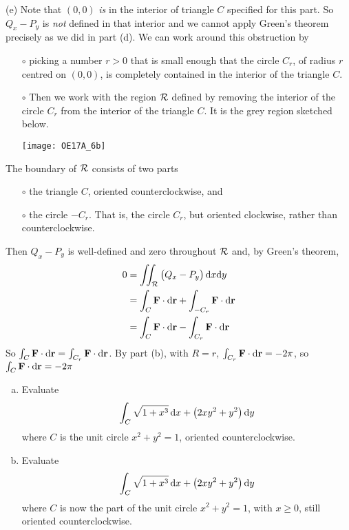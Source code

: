 \begin{solution}
(e) Note that $(0,0)$ \emph{is} in the interior of triangle $C$ specified 
for this part. So $Q_x - P_y$ is \emph{not} defined in that interior 
and we cannot apply Green's theorem precisely as we did in part (d).
We can work around this obstruction by 
\begin{itemize}\itemsep1pt \parskip0pt  %
\item[$\circ$]
picking a number $r>0$ that is small
enough that the circle $C_r$, of radius $r$ centred on $(0,0)$,
is completely contained in the interior of the triangle $C$. 
\item[$\circ$]
Then we work with
the region $\mathcal{R}$ defined by removing the interior of the circle $C_r$
from the interior of the triangle $C$. It is the grey region sketched below.
\begin{center}
     \texttt{[image: OE17A\_6b]}
\end{center}
\end{itemize}
The boundary of $\mathcal{R}$ consists of two parts
\begin{itemize}\itemsep1pt \parskip0pt  %
\item[$\circ$]
the triangle $C$, oriented counterclockwise, and
\item[$\circ$]
the circle $-C_r$. That is, the circle $C_r$, but oriented clockwise,
rather than counterclockwise.
\end{itemize}
Then $Q_x-P_y$ is well-defined and zero throughout $\mathcal{R}$ and,
by Green's theorem,
\begin{align*}
   0 &=\iint_{\mathcal{R}} \big(Q_x-P_y\big)\,\mathrm{d}x\mathrm{d}y \\
    &= \int_C \mathbf{F}\cdot\mathrm{d}\mathbf{r} 
             + \int_{-C_r} \mathbf{F}\cdot\mathrm{d}\mathbf{r} \\
    &= \int_C \mathbf{F}\cdot\mathrm{d}\mathbf{r} 
             - \int_{C_r} \mathbf{F}\cdot\mathrm{d}\mathbf{r} 
\end{align*}
So $\int_C \mathbf{F}\cdot\mathrm{d}\mathbf{r} = \int_{C_r} \mathbf{F}\cdot\mathrm{d}\mathbf{r} $.
By part (b), with $R=r$, $\int_{C_r} \mathbf{F}\cdot\mathrm{d}\mathbf{r}=-2\pi$, so
$\int_C \mathbf{F}\cdot\mathrm{d}\mathbf{r} = -2\pi$
\end{solution}

\begin{question}[M317 2017D] %
\begin{enumerate}[(a)]
\item
Evaluate
\begin{equation*}
\int_C \sqrt{1+x^3}\,\mathrm{d}x +\big(2xy^2 + y^2\big)\,\mathrm{d}y
\end{equation*}
where $C$ is the unit circle $x^2+y^2 = 1$, oriented counterclockwise.

\item 
Evaluate
\begin{equation*}
\int_C \sqrt{1+x^3}\,\mathrm{d}x +\big(2xy^2 + y^2\big)\,\mathrm{d}y
\end{equation*}
where $C$ is now the part of the unit circle $x^2+y^2 = 1$, with $x\ge 0$, 
still oriented counterclockwise.
\end{enumerate}
\end{question}

